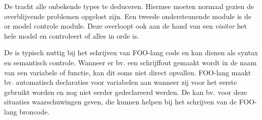 De  tracht alle onbekende types te deduceren. Hiermee
moeten normaal gezien de overblijvende problemen opgelost zijn. Een tweede
ondersteunende module is de  or model controle module. Deze
overloopt ook aan de hand van een \emph{visitor} het hele model en controleert
of alles in orde is.

De  is typisch nuttig bij het schrijven van FOO-lang code
en kan dienen als syntax en semantisch controle. Wanneer er bv. een schrijffout
gemaakt wordt in de naam van een variabele of functie, kan dit soms niet direct
opvallen. FOO-lang maakt bv. automatisch declaraties voor variabelen aan
wanneer zij voor het eerste gebruikt worden en nog niet eerder gedeclareerd
werden. De  kan bv. voor deze situaties waarschuwingen
geven, die kunnen helpen bij het schrijven van de FOO-lang broncode.
